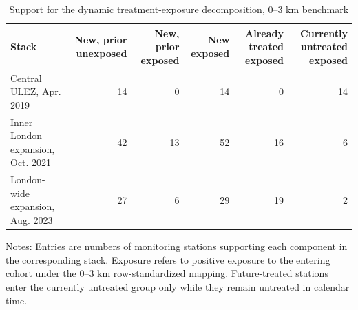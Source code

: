\begin{table}[!htbp]
\centering
\caption{Support for the dynamic treatment-exposure decomposition, 0--3 km benchmark}
\label{tab:ulez_dynamic_support_3km}
\small
\begin{threeparttable}
\begin{tabular}{lrrrrr}
\toprule
Stack & New, prior unexposed & New, prior exposed & New exposed & Already treated exposed & Currently untreated exposed \\
\midrule
Central ULEZ, Apr. 2019 & 14 & 0 & 14 & 0 & 14 \\
Inner London expansion, Oct. 2021 & 42 & 13 & 52 & 16 & 6 \\
London-wide expansion, Aug. 2023 & 27 & 6 & 29 & 19 & 2 \\
\bottomrule
\end{tabular}
\begin{tablenotes}[flushleft]
\footnotesize
\item Notes: Entries are numbers of monitoring stations supporting each component in the corresponding stack. Exposure refers to positive exposure to the entering cohort under the 0--3 km row-standardized mapping. Future-treated stations enter the currently untreated group only while they remain untreated in calendar time.
\end{tablenotes}
\end{threeparttable}
\end{table}
